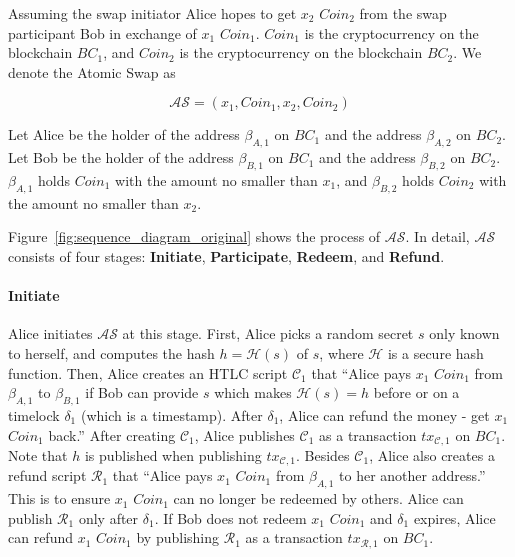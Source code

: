 Assuming the swap initiator Alice hopes to get $x_2$ $Coin_2$ from the swap participant Bob in exchange of $x_1$ $Coin_1$. 
$Coin_1$ is the cryptocurrency on the blockchain $BC_1$, and $Coin_2$ is the cryptocurrency on the blockchain $BC_2$.
We denote the Atomic Swap as 

$$\mathcal{AS} = (x_1, Coin_1, x_2, Coin_2)$$

Let Alice be the holder of the address $\beta_{A, 1}$ on $BC_1$ and the address $\beta_{A, 2}$ on $BC_2$.
Let Bob be the holder of the address $\beta_{B, 1}$ on $BC_1$ and the address $\beta_{B, 2}$ on $BC_2$.
$\beta_{A, 1}$ holds $Coin_1$ with the amount no smaller than $x_1$, and $\beta_{B, 2}$ holds $Coin_2$ with the amount no smaller than $x_2$.

Figure~\ref{fig:sequence_diagram_original} shows the process of $\mathcal{AS}$.
In detail, $\mathcal{AS}$ consists of four stages:
\textbf{Initiate},
\textbf{Participate},
\textbf{Redeem}, and
\textbf{Refund}.


\paragraph{\textbf{Initiate}}
Alice initiates $\mathcal{AS}$ at this stage.
First, Alice picks a random secret $s$ only known to herself, and computes the hash $h = \mathcal{H}(s)$ of $s$, where $\mathcal{H}$ is a secure hash function.
Then, Alice creates an HTLC script $\mathcal{C}_1$ that ``Alice pays $x_1$ $Coin_1$ from $\beta_{A, 1}$ to $\beta_{B, 1}$ if Bob can provide $s$ which makes $\mathcal{H}(s) = h$ before or on a timelock $\delta_1$ (which is a timestamp). After $\delta_1$, Alice can refund the money - get $x_1$ $Coin_1$ back.''
After creating $\mathcal{C}_1$, Alice publishes $\mathcal{C}_1$ as a transaction $tx_{\mathcal{C}, 1}$ on $BC_1$.
Note that $h$ is published when publishing $tx_{\mathcal{C}, 1}$.
Besides $\mathcal{C}_1$, Alice also creates a refund script $\mathcal{R}_1$ that ``Alice pays $x_1$ $Coin_1$ from $\beta_{A, 1}$ to her another address.''
This is to ensure $x_1$ $Coin_1$ can no longer be redeemed by others. Alice can publish $\mathcal{R}_1$ only after $\delta_1$.
If Bob does not redeem $x_1$ $Coin_1$ and $\delta_1$ expires, Alice can refund $x_1$ $Coin_1$ by publishing $\mathcal{R}_1$ as a transaction $tx_{\mathcal{R}, 1}$ on $BC_1$.

